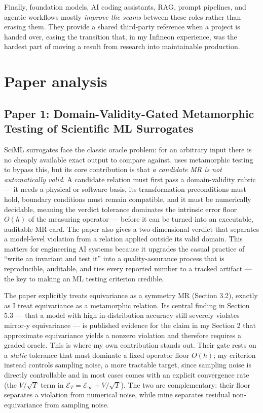 \documentclass[11pt, a4paper]{article}
\begin{document}
Finally, foundation models, AI coding assistants, RAG, prompt pipelines, and agentic workflows mostly \emph{improve the seams} between these roles rather than erasing them. They provide a shared third-party reference when a project is handed over, easing the transition that, in my Infineon experience, was the hardest part of moving a result from research into maintainable production.

\section{Paper analysis}

\subsection{Paper 1: Domain-Validity-Gated Metamorphic Testing of Scientific ML Surrogates}

SciML surrogates face the classic oracle problem: for an arbitrary input there is no cheaply available exact output to compare against. \cite{liDomainValidityGatedMetamorphicTesting2026} uses metamorphic testing to bypass this, but its core contribution is that \emph{a candidate MR is not automatically valid}. A candidate relation must first pass a domain-validity rubric — it needs a physical or software basis, its transformation preconditions must hold, boundary conditions must remain compatible, and it must be numerically decidable, meaning the verdict tolerance dominates the intrinsic error floor $O(h)$ of the measuring operator — before it can be turned into an executable, auditable MR-card. The paper also gives a two-dimensional verdict that separates a model-level violation from a relation applied outside its valid domain. This matters for engineering AI systems because it upgrades the casual practice of ``write an invariant and test it'' into a quality-assurance process that is reproducible, auditable, and ties every reported number to a tracked artifact — the key to making an ML testing criterion credible.

The paper explicitly treats equivariance as a symmetry MR (Section 3.2), exactly as I treat equivariance as a metamorphic relation. Its central finding in Section 5.3 — that a model with high in-distribution accuracy still severely violates mirror-y equivariance — is published evidence for the claim in my Section 2 that approximate equivariance yields a nonzero violation and therefore requires a graded oracle. This is where my own contribution stands out. Their gate rests on a \emph{static} tolerance that must dominate a fixed operator floor $O(h)$; my criterion instead controls sampling noise, a more tractable target, since sampling noise is directly controllable and in most cases comes with an explicit convergence rate (the $V/\sqrt{T}$ term in $\mathcal{E}_T = \mathcal{E}_\infty + V/\sqrt{T}$). The two are complementary: their floor separates a violation from numerical noise, while mine separates residual non-equivariance from sampling noise.
\end{document}
